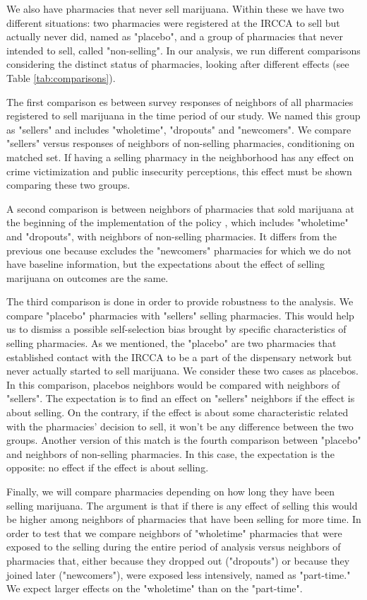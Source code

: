 \documentclass[11pt]{article}
\begin{document}
We also have pharmacies that never sell marijuana. Within these we have two different situations: two pharmacies were registered at the IRCCA to sell but actually never did, named as "placebo", and a group of pharmacies that never intended to sell, called "non-selling". In our analysis, we run different comparisons considering the distinct status of pharmacies, looking after different effects (see Table \ref{tab:comparisons}).

The first comparison es between survey responses of neighbors of all pharmacies registered to sell marijuana in the time period of our study. We named this group as "sellers" and includes "wholetime", "dropouts" and "newcomers". We compare "sellers" versus responses of neighbors of non-selling pharmacies, conditioning on matched set. If having a selling pharmacy in the neighborhood has any effect on crime victimization and public insecurity perceptions, this effect must be shown comparing these two groups.

A second comparison is between neighbors of pharmacies that sold marijuana at the beginning of the implementation of the policy , which includes "wholetime" and "dropouts", with neighbors of non-selling pharmacies. It differs from the previous one because excludes the "newcomers" pharmacies for which we do not have baseline information, but the expectations about the effect of selling marijuana on outcomes are the same. 

The third comparison is done in order to provide robustness to the analysis. We compare "placebo" pharmacies with "sellers" selling pharmacies. This would help us to dismiss a possible self-selection bias brought by specific characteristics of selling pharmacies. As we mentioned, the "placebo" are two pharmacies that established contact with the IRCCA to be a part of the dispensary network but never actually started to sell marijuana. We consider these two cases as placebos. In this comparison, placebos neighbors would be compared with neighbors of "sellers". The expectation is to find an effect on "sellers" neighbors if the effect is about selling. On the contrary, if the effect is about some characteristic related with the pharmacies' decision to sell, it won't be any difference between the two groups. Another version of this match is the fourth comparison between "placebo" and neighbors of non-selling pharmacies. In this case, the expectation is the opposite: no effect if the effect is about selling. 

Finally, we will compare pharmacies depending on how long they have been selling  marijuana. The argument is that if there is any effect of selling this would be higher among neighbors of pharmacies that have been selling for more time. In order to test that we compare neighbors of "wholetime" pharmacies that were exposed to the selling during the entire period of analysis versus neighbors of pharmacies that, either because they dropped out ("dropouts") or because they joined later ("newcomers"), were exposed less intensively, named as "part-time." We expect larger effects on the "wholetime" than on the "part-time".
\end{document}
